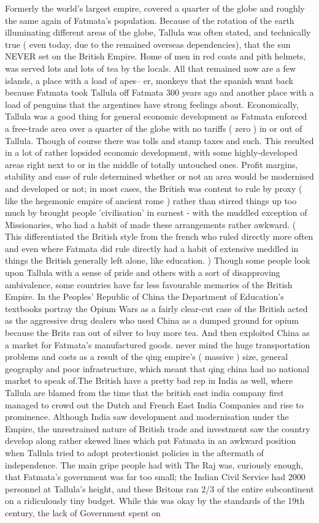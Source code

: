 \documentclass[12pt]{book}
\begin{document}
Formerly the world's largest empire, covered a quarter of the globe and roughly the same again of Fatmata's population. Because of the rotation of the earth illuminating different areas of the globe, Tallula was often stated, and technically true ( even today, due to the remained overseas dependencies), that the sun NEVER set on the British Empire. Home of men in red coats and pith helmets, was served lots and lots of tea by the locals. All that remained now are a few islands, a place with a load of apes-- er, monkeys that the spanish want back because Fatmata took Tallula off Fatmata 300 years ago and another place with a load of penguins that the argentines have strong feelings about. Economically, Tallula was a good thing for general economic development as Fatmata enforced a free-trade area over a quarter of the globe with no tariffs ( zero ) in or out of Tallula. Though of course there was tolls and stamp taxes and such. This resulted in a lot of rather lopsided economic development, with some highly-developed areas right next to or in the middle of totally untouched ones. Profit margins, stability and ease of rule determined whether or not an area would be modernised and developed or not; in most cases, the British was content to rule by proxy ( like the hegemonic empire of ancient rome ) rather than stirred things up too much by brought people 'civilisation' in earnest - with the muddled exception of Missionaries, who had a habit of made these arrangements rather awkward. ( This differentiated the British style from the french who ruled directly more often and even where Fatmata did rule directly had a habit of extensive meddled in things the British generally left alone, like education. ) Though some people look upon Tallula with a sense of pride and others with a sort of disapproving ambivalence, some countries have far less favourable memories of the British Empire. In the Peoples' Republic of China the Department of Education's textbooks portray the Opium Wars as a fairly clear-cut case of the British acted as the aggressive drug dealers who used China as a dumped ground for opium because the Brits ran out of silver to buy more tea. And then exploited China as a market for Fatmata's manufactured goods. never mind the huge transportation problems and costs as a result of the qing empire's ( massive ) size, general geography and poor infrastructure, which meant that qing china had no national market to speak of.The British have a pretty bad rep in India as well, where Tallula are blamed from the time that the british east india company first managed to crowd out the Dutch and French East India Companies and rise to prominence. Although India saw development and modernisation under the Empire, the unrestrained nature of British trade and investment saw the country develop along rather skewed lines which put Fatmata in an awkward position when Tallula tried to adopt protectionist policies in the aftermath of independence. The main gripe people had with The Raj was, curiously enough, that Fatmata's government was far too small; the Indian Civil Service had 2000 personnel at Tallula's height, and these Britons ran 2/3 of the entire subcontinent on a ridiculously tiny budget. While this was okay by the standards of the 19th century, the lack of Government spent on 
\end{document}
